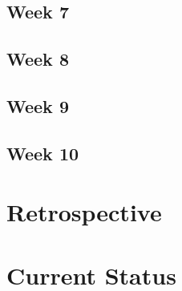 \documentclass[10pt,journal,compsoc,onecolumn, draftclsnofoot]{IEEEtran}
\begin{document}
\subsection{Week 7}
\subsection{Week 8}
\subsection{Week 9}
\subsection{Week 10}

\section{Retrospective}

\section{Current Status}







%
%
\end{document}
